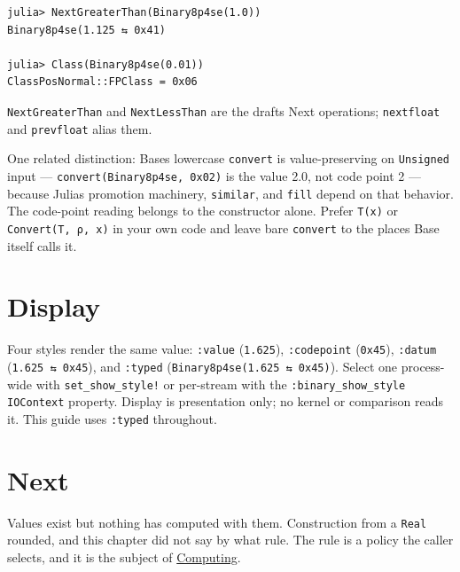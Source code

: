 \begin{verbatim}
julia> NextGreaterThan(Binary8p4se(1.0))
Binary8p4se(1.125 ⇆ 0x41)

julia> Class(Binary8p4se(0.01))
ClassPosNormal::FPClass = 0x06
\end{verbatim}



\texttt{NextGreaterThan} and \texttt{NextLessThan} are the draft{\textquotesingle}s Next operations; \texttt{nextfloat} and \texttt{prevfloat} alias them.



One related distinction: Base{\textquotesingle}s lowercase \texttt{convert} is value-preserving on \texttt{Unsigned} input — \texttt{convert(Binary8p4se, 0x02)} is the value 2.0, not code point 2 — because Julia{\textquotesingle}s promotion machinery, \texttt{similar}, and \texttt{fill} depend on that behavior. The code-point reading belongs to the constructor alone. Prefer \texttt{T(x)} or \texttt{Convert(T, ρ, x)} in your own code and leave bare \texttt{convert} to the places Base itself calls it.



\section{Display}



\label{12429740135947470305}{}


Four styles render the same value: \texttt{:value} (\texttt{1.625}), \texttt{:codepoint} (\texttt{0x45}), \texttt{:datum} (\texttt{1.625 ⇆ 0x45}), and \texttt{:typed} (\texttt{Binary8p4se(1.625 ⇆ 0x45)}). Select one process-wide with \texttt{set\_show\_style!} or per-stream with the \texttt{:binary\_show\_style} \texttt{IOContext} property. Display is presentation only; no kernel or comparison reads it. This guide uses \texttt{:typed} throughout.



\section{Next}



\label{9862256287407127426}{}


Values exist but nothing has computed with them. Construction from a \texttt{Real} rounded, and this chapter did not say by what rule. The rule is a policy the caller selects, and it is the subject of \href{computing.md}{Computing}.



